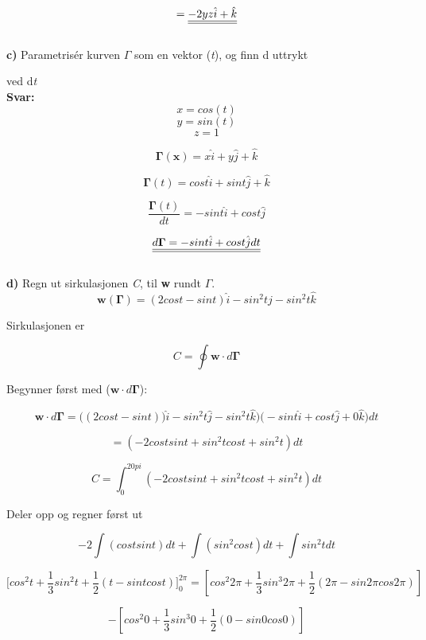 \documentclass[a4paper,norsk,12pt]{article}
\begin{document}
$$
\def\doubleunderline#1{\underline{\underline{#1}}}
= \doubleunderline{-2yz \hat i + \hat k}
$$ \\

\textbf{c)} Parametrisér kurven {$\Gamma$} som en vektor \bm{$\Gamma$} (\textit{t}), og finn d \bm{$\Gamma$} uttrykt 

\hspace{4mm} ved d{\textit{t}}\\

\textbf{Svar:} \\

$$
x = cos(t)
$$
$$
y = sin(t)
$$
$$
z = 1
$$

$$\bm{\Gamma} (\bm{x})= x \hat i + y \hat j + \hat k $$

$$\bm{\Gamma} ({t}) = cos t \hat i + sin t \hat j + \hat k $$

$$ \dfrac{\bm{\Gamma} ({t})}{dt} = -sin t \hat i + cos t \hat j $$


$$
\def\doubleunderline#1{\underline{\underline{#1}}}
\doubleunderline{d \bm{\Gamma}   = -sin t \hat i + cos t \hat j dt}
$$\\

\textbf{d)} Regn ut sirkulasjonen \textit{C}, til \textbf{w} rundt $\Gamma$.\\

$$
\textbf{w} (\bm{\Gamma}) =  (2 cos t - sin t) \hat i - sin^2 t \hat j - sin^2 t \hat k
$$

Sirkulasjonen er 

$$ C = \oint \textbf{w} \cdot d {\bm{\Gamma} } $$

Begynner først med ($\bm{w} \cdot d {\bm{\Gamma} }$):

$$
\bm{w} \cdot d {\bm{\Gamma} } = \Big( (2 cos t - sin t) ) \hat i - sin^2 t \hat j - sin^2 t \hat k \Big) \Big( -sin t \hat i + cos t \hat j + 0 \hat k \Big) dt
$$

$$
= (-2cos t sin t + sin^2 t cos t + sin^2 t ) dt 
$$

$$
C = \int_0^{2 0pi}  (-2cos t sin t + sin^2 t cos t + sin^2 t ) dt
$$

Deler opp og regner først ut

$$
-2 \int (cos t sin t ) dt + \int (sin^2 cos t) dt + \int sin^2 t dt
$$


$$\Big[cos^2 t + \dfrac{1}{3} sin^2 t + \dfrac{1}{2} (t - sin t cos t) \Big]_0^{2 \pi} = [cos^2 2\pi + \dfrac{1}{3} sin^3 2\pi + \dfrac{1}{2} ({2 \pi} - sin {2 \pi} cos {2 \pi})] 
$$

$$
-[cos^2 0 + \dfrac{1}{3} sin^3 0 + \dfrac{1}{2} ({0} - sin {0} cos {0})] 
$$
\end{document}
